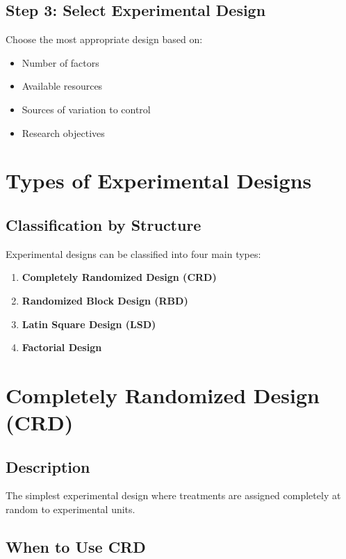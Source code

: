 \documentclass[twoside]{book}
\begin{document}
\subsection{Step 3: Select Experimental Design}

Choose the most appropriate design based on:
\begin{itemize}
    \item Number of factors
    \item Available resources
    \item Sources of variation to control
    \item Research objectives
\end{itemize}

\section{Types of Experimental Designs}

\subsection{Classification by Structure}

Experimental designs can be classified into four main types:

\begin{enumerate}
    \item \textbf{Completely Randomized Design (CRD)}
    \item \textbf{Randomized Block Design (RBD)}
    \item \textbf{Latin Square Design (LSD)}
    \item \textbf{Factorial Design}
\end{enumerate}

\section{Completely Randomized Design (CRD)}

\subsection{Description}

The simplest experimental design where treatments are assigned completely at random to experimental units.

\subsection{When to Use CRD}
\end{document}
